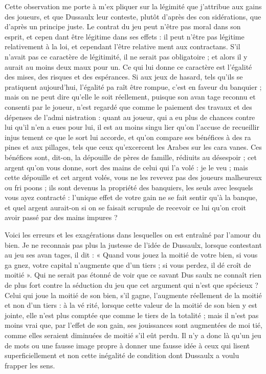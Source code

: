Cette observation me porte à m'ex%
pliquer sur la légimité que j'attribue
aux gains des joueurs, et que Dussaulx
leur conteste, plutôt d'après des con%
sidérations, que d'après un principe
juste. Le contrat du jeu peut n'être
pas moral dans son esprit, et cepen%
dant être légitime dans ses effets : il
peut n'être pas légitime relativement
à la loi, et cependant l'être relative%
ment aux contractans. S'il n'avait pas
ce caractère de légitimité, il ne serait
pas obligatoire ; et alors il y aurait au
moins deux maux pour un. Ce qui lui
donne ce caractère est l'égalité des
mises, des risques et des espérances.
Si aux jeux de hasard, tels qu'ils se
pratiquent aujourd'hui, l'égalité pa%
raît être rompue, c'est en faveur du
banquier ; mais on ne peut dire qu'elle
le soit réellement, puisque son avan
tage reconnu et consenti par le joueur,
n'est regardé que comme le paiement
des travaux et des dépenses de l'admi%
nistration : quant au joueur, qui a eu
plus de chances contre lui qu'il n'en
a eues pour lui, il est au moins singu%
lier qu'on l'accuse de recueillir injus%
tement ce que le sort lui accorde, et
qu'on compare ses bénéfices à des ra%
pines et aux pillages, tels que ceux
qu'excercent les Arabes sur les cara%
vanes. Ces bénéfices sont, dit-on, la
dépouille de pères de famille, rédiuits
au désespoir ; cet argent qu'on vous
donne, sort des mains de celui qui l'a
volé : je le veu ; mais cette dépouille
et cet argent volés, vous ne les revevez
pas des joueurs malheureux ou fri%
poons ; ils sont devenus la propriété
des banquiers, les seuls avec lesquels
vous ayez contracté : l'unique effet
de votre gain ne se fait sentir qu'à la
banque, et quel argent aurait-on si
on se faisait scrupule de recevoir ce%
lui qu'on croit avoir passé par des
mains impures ?

Voici les erreurs et les exagérations
dans lesquelles on est entraîné par
l'amour du bien. Je ne reconnais pas
plus la justesse de l'idée de Dussaulx,
lorsque contestant au jeu ses avan%
tages, il dit : « Quand vous jouez la
moitié de votre bien, si vous ga%
gnez, votre capital n'augmente que
d'un tiers ; si vous perdez, il dé%
croît de moitié ». Qui ne serait pas
étonné de voir que ce savant Dus%
saulx ne connaît rien de plus fort
contre la séduction du jeu que cet
argument qui n'est que spécieux ?
Celui qui joue la moitié de son bien,
s'il gagne, l'augmente réellement de
la moitié et non d'un tiers : à la vé%
rité, lorsque cette valeur de la moitié
de son bien y est jointe, elle n'est
plus comptée que comme le tiers de
la totalité ; mais il n'est pas moins
vrai que, par l'effet de son gain, ses
jouissances sont augmentées de moi%
tié, comme elles seraient diminuées
de moitié s'il eût perdu. Il n'y a donc
là qu'un jeu de mots ou une fausse
image propre à donner une fausse idée
à ceux qui lisent superficiellement et
non cette inégalité de condition dont
Dussaulx a voulu frapper les sens.

